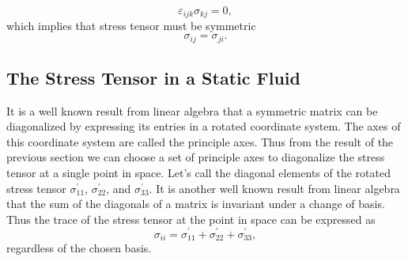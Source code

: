 \documentclass[12pt, letter]{report}
\begin{document}
\begin{equation}
\varepsilon_{ijk} \sigma_{kj} = 0,
\end{equation}
which implies that stress tensor must be symmetric
\begin{equation}
\sigma_{ij} = \sigma_{ji}.
\end{equation}
\subsection{The Stress Tensor in a Static Fluid}
It is a well known result from linear algebra that a symmetric matrix can be diagonalized by expressing its entries in a rotated coordinate system. The axes of this coordinate system are called the principle axes. Thus from the result of the previous section we can choose a set of principle axes to diagonalize the stress tensor at a single point in space. Let's call the diagonal elements of the rotated stress tensor $\sigma^{'}_{11}$, $\sigma^{'}_{22}$, and $\sigma^{'}_{33}$. It is another well known result from linear algebra that the sum of the diagonals of a matrix is invariant under a change of basis. Thus the trace of the stress tensor at the point in space can be expressed as
\begin{equation}
\sigma_{ii} = \sigma^{'}_{11} + \sigma^{'}_{22} + \sigma^{'}_{33},
\end{equation}
regardless of the chosen basis.
\end{document}
